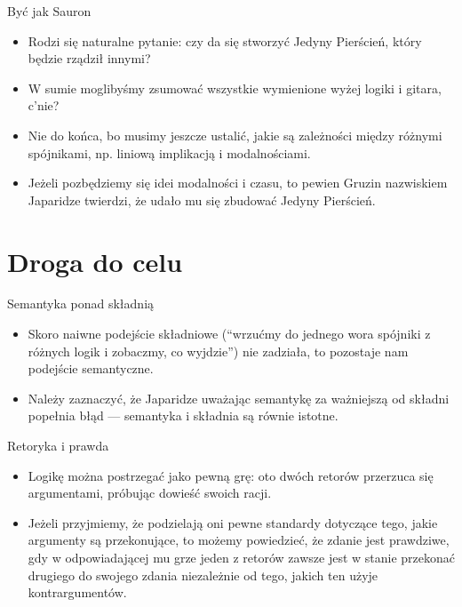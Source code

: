 \documentclass{beamer}
\begin{document}
\begin{frame}{Być jak Sauron}
\begin{itemize}
	\item Rodzi się naturalne pytanie: czy da się stworzyć Jedyny Pierścień, który będzie rządził innymi?
	\item W sumie moglibyśmy zsumować wszystkie wymienione wyżej logiki i gitara, c'nie?
	\item Nie do końca, bo musimy jeszcze ustalić, jakie są zależności między różnymi spójnikami, np. liniową implikacją i modalnościami.
	\item Jeżeli pozbędziemy się idei modalności i czasu, to pewien Gruzin nazwiskiem Japaridze twierdzi, że udało mu się zbudować Jedyny Pierścień.
\end{itemize}
\end{frame}

\section{Droga do celu}

\begin{frame}{Semantyka ponad składnią}
\begin{itemize}
	\item Skoro naiwne podejście składniowe (``wrzućmy do jednego wora spójniki z różnych logik i zobaczmy, co wyjdzie'') nie zadziała, to pozostaje nam podejście semantyczne. \\
	\item Należy zaznaczyć, że Japaridze uważając semantykę za ważniejszą od składni popełnia błąd — semantyka i składnia są równie istotne.
\end{itemize}
\end{frame}

\begin{frame}{Retoryka i prawda}
\begin{itemize}
	\item Logikę można postrzegać jako pewną grę: oto dwóch retorów przerzuca się argumentami, próbując dowieść swoich racji.
	\item Jeżeli przyjmiemy, że podzielają oni pewne standardy dotyczące tego, jakie argumenty są przekonujące, to możemy powiedzieć, że zdanie jest prawdziwe, gdy w odpowiadającej mu grze jeden z retorów zawsze jest w stanie przekonać drugiego do swojego zdania niezależnie od tego, jakich ten użyje kontrargumentów.
\end{itemize}
\end{frame}
\end{document}
